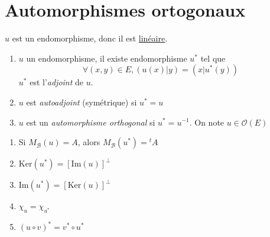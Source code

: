 \documentclass[11pt,a4paper,fleqn,pdftex]{report}
\begin{document}
\section{Automorphismes ortogonaux}
$u$ est un endomorphisme, donc il est \uline{linéaire}.
\begin{dfn}
    \renewcommand{\theenumi}{\roman{enumi}}%
    \begin{enumerate}
        \item $u$ un endomorphisme, il existe  endomorphisme $u^*$ tel que
        \begin{equation*}
            \forall (x,y) \in E, (u(x)|y) = (x | u^*(y))
        \end{equation*}
        $u^*$ est l'\emph{adjoint} de $u$.
        \item $u$ est \emph{autoadjoint} (symétrique) si $u^* = u$ 
        \item $u$ est un \emph{automorphisme orthogonal} si $u^* = u^{-1}$. On note $u \in \mathcal{O}(E)$
    \end{enumerate}
\end{dfn}

\begin{prop}
    \renewcommand{\theenumi}{\roman{enumi}}%
    \begin{enumerate}
        \item Si $M_\mathcal{B}(u) = A$, alors $M_\mathcal{B}(u^*) = {}^tA$
        \item $\mathrm{Ker}(u^*) = \left[ \mathrm{Im}(u) \right]^\perp$
        \item $\mathrm{Im}(u^*) = \left[ \mathrm{Ker}(u) \right]^\perp$
        \item $\chi_u = \chi_{u^*}$
        \item $(u\circ v)^* = v^* \circ u^*$
    \end{enumerate}
\end{prop}
\end{document}
